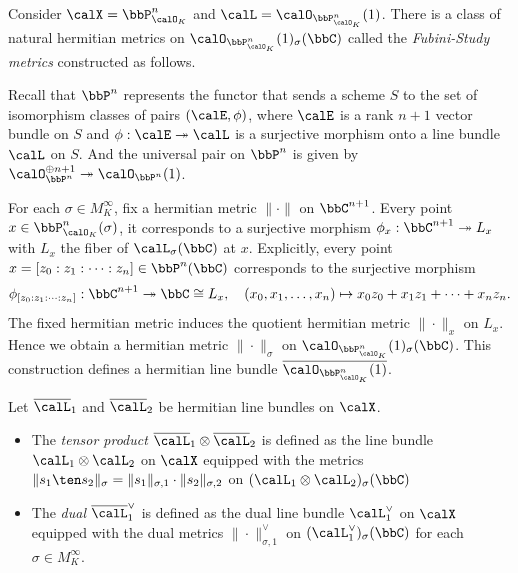     \begin{example}\label{eg:Fubini_Study_metric_on_O_1}
        Consider \(\calX = \bbP^n_{\calO_K}\) and \(\calL = \calO_{\bbP^n_{\calO_K}}(1)\).
        There is a class of natural hermitian metrics on \(\calO_{\bbP^n_{\calO_K}}(1)_\sigma(\bbC)\) called the \emph{Fubini-Study metrics} constructed as follows.

        Recall that \(\bbP^n\) represents the functor that sends a scheme \(S\) to the set of isomorphism classes of pairs \((\calE, \phi)\),
        where \(\calE\) is a rank \(n+1\) vector bundle on \(S\) and \(\phi: \calE \twoheadrightarrow \calL\) is a surjective morphism onto a line bundle \(\calL\) on \(S\).
        And the universal pair on \(\bbP^n\) is given by \(\calO_{\bbP^n}^{\oplus n+1} \twoheadrightarrow \calO_{\bbP^n}(1)\).

        For each \(\sigma \in M_K^\infty\), fix a hermitian metric \(\|\cdot\|\) on \(\bbC^{n+1}\).
        Every point \(x \in \bbP^n_{\calO_K}(\sigma)\), it corresponds to a surjective morphism \(\phi_x: \bbC^{n+1} \twoheadrightarrow L_x\) with \(L_x\) the fiber of \(\calL_\sigma(\bbC)\) at \(x\).
        Explicitly, every point \(x = [z_0: z_1: \cdots: z_n] \in \bbP^n(\bbC)\) corresponds to the surjective morphism
        \[ \phi_{[z_0: z_1: \cdots: z_n]}: \bbC^{n+1} \twoheadrightarrow \bbC \cong L_x, \quad (x_0, x_1, \ldots, x_n) \mapsto x_0 z_0 + x_1 z_1 + \cdots + x_n z_n. \]
        The fixed hermitian metric induces the quotient hermitian metric \(\|\cdot\|_x\) on \(L_x\).
        Hence we obtain a hermitian metric \(\|\cdot\|_{\sigma}\) on \(\calO_{\bbP^n_{\calO_K}}(1)_\sigma(\bbC)\).
        This construction defines a hermitian line bundle \(\overline{\calO_{\bbP^n_{\calO_K}}(1)}\).
    \end{example}

    \begin{definition}\label{def:tensor_product_and_dual_of_hermitian_line_bundles}
        Let \(\overline{\calL}_1\) and \(\overline{\calL}_2\) be hermitian line bundles on \(\calX\).
        \begin{itemize}
            \item The \emph{tensor product} \(\overline{\calL}_1 \otimes \overline{\calL}_2\) is defined as the line bundle \(\calL_1 \otimes \calL_2\) on \(\calX\) 
                equipped with the metrics \(\|s_1 \ten s_2\|_{\sigma} = \|s_1\|_{\sigma, 1} \cdot \|s_2\|_{\sigma, 2}\) on \((\calL_1 \otimes \calL_2)_\sigma(\bbC)\)
            \item The \emph{dual} \(\overline{\calL}_1^\vee\) is defined as the dual line bundle \(\calL_1^\vee\) on \(\calX\) 
                equipped with the dual metrics \(\|\cdot\|_{\sigma, 1}^\vee\) on \((\calL_1^\vee)_\sigma(\bbC)\) for each \(\sigma \in M_K^\infty\).
        \end{itemize}
    \end{definition}

